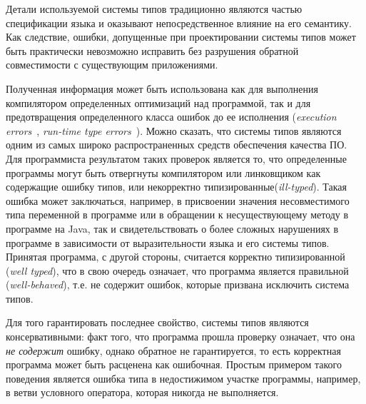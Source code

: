 Детали используемой системы типов традиционно являются частью спецификации языка
и оказывают непосредственное влияние на его семантику. Как следствие, ошибки,
допущенные при проектировании системы типов может быть практически невозможно
исправить без разрушения обратной совместимости с существующим приложениями.


Полученная информация может быть использована как для выполнения компилятором
определенных оптимизаций над программой, так и для предотвращения определенного
класса ошибок до ее исполнения (\emph{execution errors}~\cite{Cardelli2004},
\emph{run-time type errors}~\cite{Pierce2002}). Можно сказать, что системы типов
являются одним из самых широко распространенных средств обеспечения качества ПО.
Для программиста результатом таких проверок является то, что определенные
программы могут быть отвергнуты компилятором или линковщиком как содержащие
ошибку типов, или некорректно типизированные(\emph{ill-typed}).
Такая ошибка может заключаться, например, в присвоении значения несовместимого
типа переменной в программе или в обращении к несуществующему методу в программе
на Java, так и свидетельствовать о более сложных нарушениях в программе в
зависимости от выразительности языка и его системы типов. Принятая 
программа, с другой стороны, считается корректно типизированной (\emph{well
  typed}), что в свою очередь означает, что программа является правильной
(\emph{well-behaved}), т.е. не содержит ошибок, которые призвана исключить
система типов. 

Для того гарантировать последнее свойство, системы типов являются 
консервативными: факт того, что программа прошла проверку означает, что
она \emph{не содержит} ошибку, однако обратное не гарантируется, то есть
корректная программа может быть расценена как ошибочная.  Простым примером
такого поведения является ошибка типа в недостижимом участке программы,
например, в ветви условного оператора, которая никогда не выполняется. 

